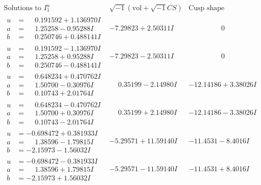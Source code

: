 \documentclass[1p]{elsarticle_modified}
\theoremstyle{definition}
\newcommand{\I}{\sqrt{-1}}
\begin{document}
$$\begin{array}{c|c|c}  
\text{Solutions to }I^u_{1}& \I (\text{vol} + \sqrt{-1}CS) & \text{Cusp shape}\\
 \hline 
\begin{aligned}
u &= \phantom{-}0.191592 + 1.136970 I \\
a &= \phantom{-}1.25258 - 0.95288 I \\
b &= \phantom{-}0.250746 + 0.488141 I\end{aligned}
 & -7.29823 + 2.50311 I & \phantom{-0.000000 } 0 \\ \hline\begin{aligned}
u &= \phantom{-}0.191592 - 1.136970 I \\
a &= \phantom{-}1.25258 + 0.95288 I \\
b &= \phantom{-}0.250746 - 0.488141 I\end{aligned}
 & -7.29823 - 2.50311 I & \phantom{-0.000000 } 0 \\ \hline\begin{aligned}
u &= \phantom{-}0.648234 + 0.470762 I \\
a &= \phantom{-}1.50700 - 0.30976 I \\
b &= \phantom{-}0.10743 + 2.01764 I\end{aligned}
 & \phantom{-}0.35199 - 2.14980 I & -12.14186 + 3.38026 I \\ \hline\begin{aligned}
u &= \phantom{-}0.648234 - 0.470762 I \\
a &= \phantom{-}1.50700 + 0.30976 I \\
b &= \phantom{-}0.10743 - 2.01764 I\end{aligned}
 & \phantom{-}0.35199 + 2.14980 I & -12.14186 - 3.38026 I \\ \hline\begin{aligned}
u &= -0.698472 + 0.381933 I \\
a &= \phantom{-}1.38596 - 1.79815 I \\
b &= -2.15973 - 1.56032 I\end{aligned}
 & -5.29571 + 11.59140 I & -11.4531 - 8.4016 I \\ \hline\begin{aligned}
u &= -0.698472 - 0.381933 I \\
a &= \phantom{-}1.38596 + 1.79815 I \\
b &= -2.15973 + 1.56032 I\end{aligned}
 & -5.29571 - 11.59140 I & -11.4531 + 8.4016 I \\ \hline\begin{aligned}

\end{aligned}
\end{array}$$
\end{document}

